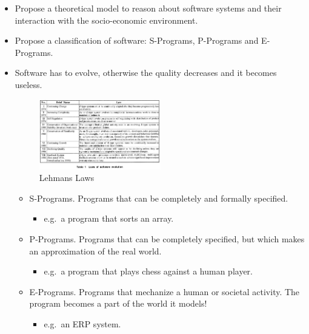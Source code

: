 \begin{itemize}
\tightlist
\item
  Propose a theoretical model to reason about software systems and their
  interaction with the socio-economic environment.
\item
  Propose a classification of software: S-Programs, P-Programs and
  E-Programs.
  
\item 
Software has to evolve, otherwise the quality decreases and it becomes useless.


\begin{figure}[H]
\centering
\includegraphics[width=0.5\textwidth]{figures/LehmansLaw.png}
\caption{Lehmans Laws}
\end{figure}


  \begin{itemize}
  \tightlist
  \item
    S-Programs. Programs that can be completely and formally specified.

    \begin{itemize}
    \tightlist
    \item
      e.g.~a program that sorts an array.
    \end{itemize}
  \item
    P-Programs. Programs that can be completely specified, but which
    makes an approximation of the real world.

    \begin{itemize}
    \tightlist
    \item
      e.g.~a program that plays chess against a human player.
    \end{itemize}
  \item
    E-Programs. Programs that mechanize a human or societal activity.
    The program becomes a part of the world it models!

    \begin{itemize}
    \tightlist
    \item
      e.g.~an ERP system.
    \end{itemize}
  \end{itemize}
\end{itemize}


